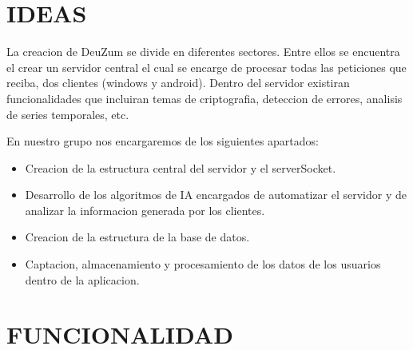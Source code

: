 \documentclass{article}
\theoremstyle{definition}
\begin{document}
\section{IDEAS}

La creacion de DeuZum se divide en diferentes sectores. Entre ellos se encuentra el crear un servidor central el cual se encarge de procesar todas las peticiones que reciba, dos clientes (windows y android). Dentro del servidor existiran funcionalidades que incluiran temas de criptografia, deteccion de errores, analisis de series temporales, etc.

En nuestro grupo nos encargaremos de los siguientes apartados:
\begin{itemize}
\item Creacion de la estructura central del servidor y el serverSocket.
\item Desarrollo de los algoritmos de IA encargados de automatizar el servidor y de analizar la informacion generada por los clientes.
\item Creacion de la estructura de la base de datos.
\item Captacion, almacenamiento y procesamiento de los datos de los usuarios dentro de la aplicacion.
\end{itemize}

\section{FUNCIONALIDAD}
\end{document}
